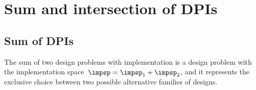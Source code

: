 

\section{Sum and intersection of DPIs}
\label{subsec:dpi-intersection}

\subsection{Sum of DPIs}\label{subsec:dpi-union}

The sum of two design problems with implementation is a design problem with the implementation space~$\impsp=\impsp_{1}+\impsp_{2}$, and it represents the exclusive choice between two possible alternative families of designs.

\begin{marginfigure}
    \centering
    \caption{}
    \label{fig:dpcoproduct}
\end{marginfigure}

